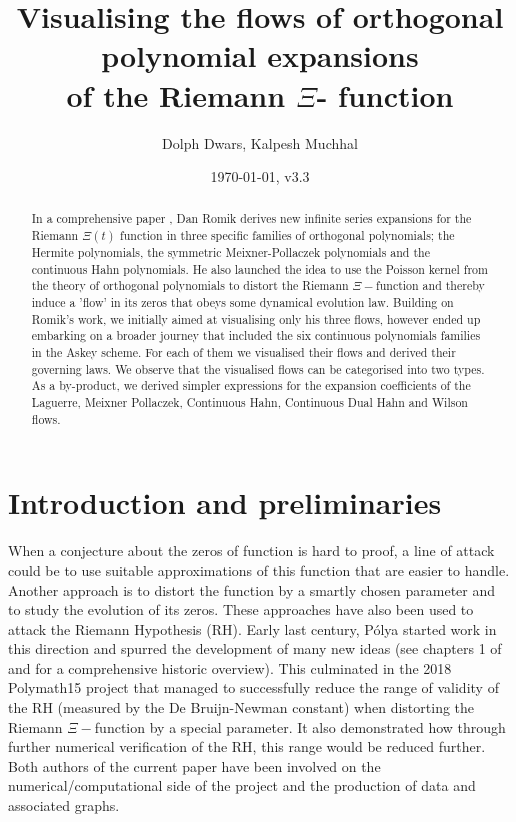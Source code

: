 \documentclass[a4paper,11pt,twoside]{amsart}
\title[Visualising the flows of orthogonal polynomial expansions of the Riemann $\Xi$-function]{Visualising the flows of orthogonal polynomial expansions \\ of the Riemann $\Xi$- function}
\author{Dolph Dwars, Kalpesh Muchhal}
\date{\today, v3.3}
\begin{document}
\begin{abstract}
In a comprehensive paper \cite{rom}, Dan Romik derives new infinite series expansions for the Riemann $\Xi(t)$ function in three specific families of orthogonal polynomials; the Hermite polynomials, the symmetric Meixner-Pollaczek polynomials and the continuous Hahn polynomials. He also launched the idea to use the Poisson kernel from the theory of orthogonal polynomials to distort the Riemann $\Xi-$function and thereby induce a 'flow' in its zeros that obeys some dynamical evolution law. Building on Romik's work, we initially aimed at visualising only his three flows, however ended up embarking on a broader journey that included the six continuous polynomials families in the Askey scheme. For each of them we visualised their flows and derived their governing laws. We observe that the visualised flows can be categorised into two types. As a by-product, we derived simpler expressions for the expansion coefficients of the Laguerre, Meixner Pollaczek, Continuous Hahn, Continuous Dual Hahn and Wilson flows.  
\end{abstract}

\maketitle

\section{Introduction and preliminaries}

When a conjecture about the zeros of function is hard to proof, a line of attack could be to use suitable approximations of this function that are easier to handle. Another approach is to distort the function by a smartly chosen parameter and to study the evolution of its zeros. These approaches have also been used to attack the Riemann Hypothesis (RH). Early last century, Pólya started work in this direction and spurred the development of many new ideas (see chapters 1 of \cite{rom} and \cite{pol} for a comprehensive historic overview). This culminated in the 2018 Polymath15 project \cite{pol} that managed to successfully reduce the range of validity of the RH (measured by the De Bruijn-Newman constant) when distorting the Riemann $\Xi-$function by a special parameter. It also demonstrated how through further numerical verification of the RH, this range would be reduced further. Both authors of the current paper have been involved on the numerical/computational side of the project and the production of data and associated graphs. 
\end{document}
